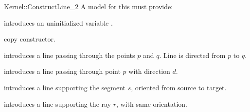 \begin{ccRefFunctionObjectConcept}{Kernel::ConstructLine_2}
A model for this must provide:


\ccHidden {}
             {introduces an uninitialized variable .}

\ccHidden {}
 	    {copy constructor.}

            {introduces a line  passing through the points $p$ and $q$. 
             Line  is directed from $p$ to $q$.}

            {introduces a line  passing through point $p$ with 
             direction $d$.}

            {introduces a line  supporting the segment $s$,
	    oriented from source to target.}

            {introduces a line  supporting the ray $r$,
	    with same orientation.}

\ccSeeAlso
{}  \\

\end{ccRefFunctionObjectConcept}
